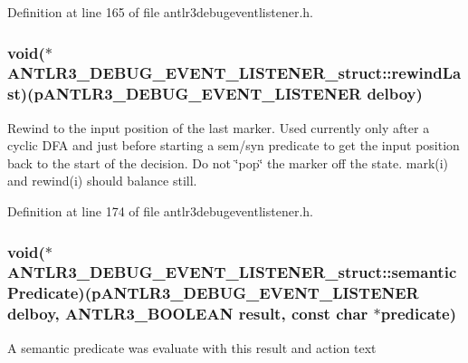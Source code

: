 Definition at line 165 of file antlr3debugeventlistener.\-h.

\hypertarget{struct_a_n_t_l_r3___d_e_b_u_g___e_v_e_n_t___l_i_s_t_e_n_e_r__struct_abc6b46435d5264bdae6ae7a7cb8996a5}{
\subsubsection[{rewind\-Last}]{\setlength{\rightskip}{0pt plus 5cm}void($\ast$ A\-N\-T\-L\-R3\-\_\-\-D\-E\-B\-U\-G\-\_\-\-E\-V\-E\-N\-T\-\_\-\-L\-I\-S\-T\-E\-N\-E\-R\-\_\-struct\-::rewind\-Last)({\bf p\-A\-N\-T\-L\-R3\-\_\-\-D\-E\-B\-U\-G\-\_\-\-E\-V\-E\-N\-T\-\_\-\-L\-I\-S\-T\-E\-N\-E\-R} delboy)}}\label{struct_a_n_t_l_r3___d_e_b_u_g___e_v_e_n_t___l_i_s_t_e_n_e_r__struct_abc6b46435d5264bdae6ae7a7cb8996a5}
Rewind to the input position of the last marker. Used currently only after a cyclic D\-F\-A and just before starting a sem/syn predicate to get the input position back to the start of the decision. Do not \char`\"{}pop\char`\"{} the marker off the state. mark(i) and rewind(i) should balance still. 

Definition at line 174 of file antlr3debugeventlistener.\-h.

\hypertarget{struct_a_n_t_l_r3___d_e_b_u_g___e_v_e_n_t___l_i_s_t_e_n_e_r__struct_ab379ec89e5227d5ee95e0420544f02f7}{
\subsubsection[{semantic\-Predicate}]{\setlength{\rightskip}{0pt plus 5cm}void($\ast$ A\-N\-T\-L\-R3\-\_\-\-D\-E\-B\-U\-G\-\_\-\-E\-V\-E\-N\-T\-\_\-\-L\-I\-S\-T\-E\-N\-E\-R\-\_\-struct\-::semantic\-Predicate)({\bf p\-A\-N\-T\-L\-R3\-\_\-\-D\-E\-B\-U\-G\-\_\-\-E\-V\-E\-N\-T\-\_\-\-L\-I\-S\-T\-E\-N\-E\-R} delboy, {\bf A\-N\-T\-L\-R3\-\_\-\-B\-O\-O\-L\-E\-A\-N} result, const char $\ast$predicate)}}\label{struct_a_n_t_l_r3___d_e_b_u_g___e_v_e_n_t___l_i_s_t_e_n_e_r__struct_ab379ec89e5227d5ee95e0420544f02f7}
A semantic predicate was evaluate with this result and action text 

